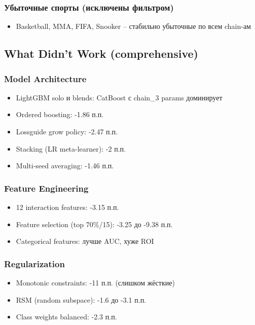 \documentclass[12pt,a4paper]{article}
\begin{document}
\subsubsection{Убыточные спорты (исключены фильтром)}
\begin{itemize}
  \item Basketball, MMA, FIFA, Snooker -- стабильно убыточные по всем chain-ам
\end{itemize}

\subsection{What Didn't Work (comprehensive)}
\subsubsection{Model Architecture}
\begin{itemize}
  \item LightGBM solo и blends: CatBoost с chain\_3 params доминирует
  \item Ordered boosting: -1.86 п.п.
  \item Lossguide grow policy: -2.47 п.п.
  \item Stacking (LR meta-learner): -2 п.п.
  \item Multi-seed averaging: -1.46 п.п.
\end{itemize}

\subsubsection{Feature Engineering}
\begin{itemize}
  \item 12 interaction features: -3.15 п.п.
  \item Feature selection (top 70\%/15): -3.25 до -9.38 п.п.
  \item Categorical features: лучше AUC, хуже ROI
\end{itemize}

\subsubsection{Regularization}
\begin{itemize}
  \item Monotonic constraints: -11 п.п. (слишком жёсткие)
  \item RSM (random subspace): -1.6 до -3.1 п.п.
  \item Class weights balanced: -2.3 п.п.
\end{itemize}
\end{document}
